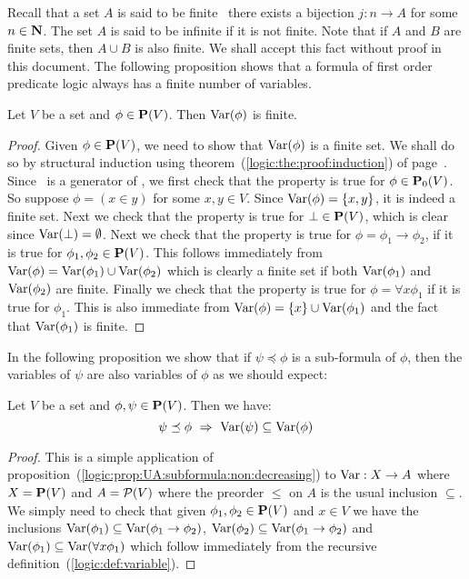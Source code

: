 Recall that a set $A$ is said to be finite \ifand\ there exists a
bijection $j:n\to A$ for some $n\in\mbox{$\bf N$}$. The set $A$ is said to be
infinite if it is not finite. Note that if $A$ and $B$ are finite
sets, then $A\cup B$ is also finite. We shall accept this fact
without proof in this document. The following proposition shows that
a formula of first order predicate logic always has a finite number
of variables.
\begin{prop}\label{logic:prop:var:is:finite}
Let $V$ be a set and $\phi\in\mbox{${\bf P}(V)$}$. Then $\mbox{\rm Var}(\phi)$ is finite.
\end{prop}
\begin{proof}
Given $\phi\in\mbox{${\bf P}(V)$}$, we need to show that $\mbox{\rm Var}(\phi)$ is a finite
set. We shall do so by structural induction using
theorem~(\ref{logic:the:proof:induction}) of
page~\pageref{logic:the:proof:induction}. Since \pvo\ is a generator
of \pv, we first check that the property is true for $\phi\in\mbox{${\bf P}_{0}(V)$}$.
So suppose $\phi=(x\in y)$ for some $x,y\in V$. Since
$\mbox{\rm Var}(\phi)=\{x,y\}$, it is indeed a finite set. Next we check that
the property is true for $\bot\in\mbox{${\bf P}(V)$}$, which is clear since
$\mbox{\rm Var}(\bot)=\emptyset$. Next we check that the property is true for
$\phi=\phi_{1}\to\phi_{2}$, if it is true for
$\phi_{1},\phi_{2}\in\mbox{${\bf P}(V)$}$. This follows immediately from
$\mbox{\rm Var}(\phi)=\mbox{\rm Var}(\phi_{1})\cup\mbox{\rm Var}(\phi_{2})$ which is clearly a
finite set if both $\mbox{\rm Var}(\phi_{1})$ and $\mbox{\rm Var}(\phi_{2})$ are finite.
Finally we check that the property is true for $\phi=\forall
x\phi_{1}$ if it is true for $\phi_{1}$. This is also immediate from
$\mbox{\rm Var}(\phi)=\{x\}\cup\mbox{\rm Var}(\phi_{1})$ and the fact that
$\mbox{\rm Var}(\phi_{1})$ is finite.
\end{proof}

In the following proposition we show that if $\psi\preceq\phi$ is a
sub-formula of $\phi$, then the variables of $\psi$ are also
variables of $\phi$ as we should expect:
\begin{prop}\label{logic:prop:FOBL:variable:subformula}
Let $V$ be a set and $\phi,\psi\in\mbox{${\bf P}(V)$}$. Then we have:
    \[
    \psi\preceq\phi\ \Rightarrow\ \var(\psi)\subseteq\var(\phi)
    \]
\end{prop}
\begin{proof}
This is a simple application of
proposition~(\ref{logic:prop:UA:subformula:non:decreasing}) to
$\mbox{\rm Var}:X\to A$ where $X=\mbox{${\bf P}(V)$}$ and $A={\cal P}(V)$ where the preorder
$\leq$ on $A$ is the usual inclusion $\subseteq$. We simply need to
check that given $\phi_{1},\phi_{2}\in\mbox{${\bf P}(V)$}$ and $x\in V$ we have the
inclusions $\mbox{\rm Var}(\phi_{1})\subseteq\mbox{\rm Var}(\phi_{1}\to\phi_{2})$,
$\mbox{\rm Var}(\phi_{2})\subseteq\mbox{\rm Var}(\phi_{1}\to\phi_{2})$ and
$\mbox{\rm Var}(\phi_{1})\subseteq\mbox{\rm Var}(\forall x\phi_{1})$ which follow
immediately from the recursive
definition~(\ref{logic:def:variable}).
\end{proof}

